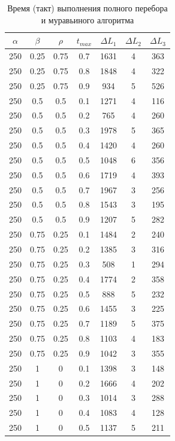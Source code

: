 \documentclass[a4paper,oneside,14pt]{extreport}
\begin{document}
\begin{table}[h]
\caption{Время (такт) выполнения полного перебора и муравьиного алгоритма}
\label{tbl:only}
\begin{center}
	\begin{tabular}{|c|c|c|c|c|c|c|}
		\hline
		$\alpha$ &  $\beta$&$\rho$ &  $t_{max}$ & $\Delta L_{1}$ & $\Delta L_{2}$ & $\Delta L_{3}$\\
		\hline
		250 & 0.25 & 0.75 & 0.7 & 1631 & 4 & 363 \\
		250 & 0.25 & 0.75 & 0.8 & 1848 & 4 & 322 \\
		250 & 0.25 & 0.75 & 0.9 & 934 & 5 & 526 \\
		250 & 0.5 & 0.5 & 0.1 & 1271 & 4 & 116 \\
		250 & 0.5 & 0.5 & 0.2 & 765 & 4 & 260 \\
		250 & 0.5 & 0.5 & 0.3 & 1978 & 5 & 365 \\
		250 & 0.5 & 0.5 & 0.4 & 1420 & 4 & 260 \\
		250 & 0.5 & 0.5 & 0.5 & 1048 & 6 & 356 \\
		250 & 0.5 & 0.5 & 0.6 & 1719 & 4 & 393 \\
		250 & 0.5 & 0.5 & 0.7 & 1967 & 3 & 256 \\
		250 & 0.5 & 0.5 & 0.8 & 1543 & 3 & 195 \\
		250 & 0.5 & 0.5 & 0.9 & 1207 & 5 & 282 \\
		250 & 0.75 & 0.25 & 0.1 & 1484 & 2 & 240 \\
		250 & 0.75 & 0.25 & 0.2 & 1385 & 3 & 316 \\
		250 & 0.75 & 0.25 & 0.3 & 508 & 1 & 294 \\
		250 & 0.75 & 0.25 & 0.4 & 1774 & 2 & 358 \\
		250 & 0.75 & 0.25 & 0.5 & 888 & 5 & 232 \\
		250 & 0.75 & 0.25 & 0.6 & 1455 & 3 & 225 \\
		250 & 0.75 & 0.25 & 0.7 & 1189 & 5 & 375 \\
		250 & 0.75 & 0.25 & 0.8 & 1103 & 4 & 183 \\
		250 & 0.75 & 0.25 & 0.9 & 1042 & 3 & 355 \\
		250 & 1 & 0 & 0.1 & 1398 & 3 & 148 \\
		250 & 1 & 0 & 0.2 & 1666 & 4 & 202 \\
		250 & 1 & 0 & 0.3 & 1014 & 3 & 288 \\
		250 & 1 & 0 & 0.4 & 1083 & 4 & 128 \\
		250 & 1 & 0 & 0.5 & 1137 & 5 & 211 \\

\end{tabular}
\end{center}
\end{table}
\end{document}
